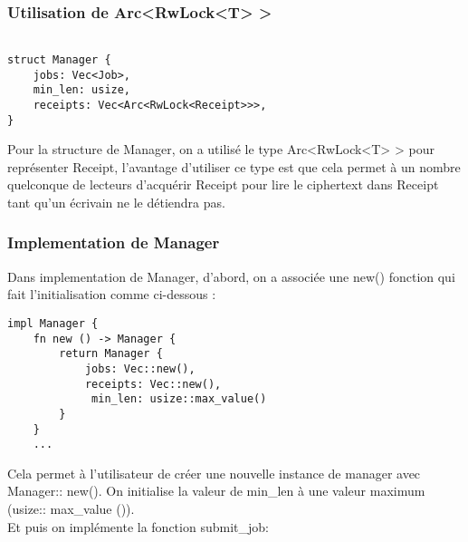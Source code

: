 \documentclass{article}
\begin{document}

\subsubsection{Utilisation de Arc<RwLock<T> > }
\ssubsection
\begin{lstlisting}

struct Manager {
    jobs: Vec<Job>,
    min_len: usize,
    receipts: Vec<Arc<RwLock<Receipt>>>,
}
\end{lstlisting}
Pour la structure de Manager, on a utilisé le type Arc<RwLock<T> > pour représenter Receipt, l'avantage d'utiliser ce type est que cela permet à un nombre quelconque de lecteurs d’acquérir Receipt pour lire le ciphertext dans Receipt tant qu’un écrivain ne le détiendra pas.\\
\subsubsection{Implementation de Manager}
Dans implementation de Manager, d'abord, on a associée une new() fonction qui fait l'initialisation comme ci-dessous : 
\begin{lstlisting}
impl Manager {
    fn new () -> Manager {
        return Manager {
            jobs: Vec::new(),
            receipts: Vec::new(),
             min_len: usize::max_value()
        }
    }
    ...
\end{lstlisting}
Cela permet à l'utilisateur de créer une nouvelle instance de manager avec Manager:: new().
On initialise la valeur de min\_len à une valeur maximum (usize:: max\_value ()).\\

Et puis on implémente la fonction submit\_job:
\end{document}
